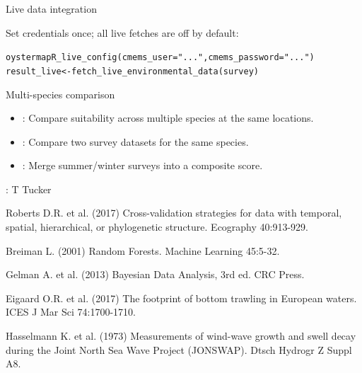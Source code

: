 \documentclass[a4paper]{book}
\begin{document}
%
\begin{Section}{Live data integration}

Set credentials once; all live fetches are off by default:

\begin{alltt}oystermapR_live_config(cmems_user = "...", cmems_password = "...")
result_live <- fetch_live_environmental_data(survey)
\end{alltt}

\end{Section}
%
\begin{Section}{Multi-species comparison}

\begin{itemize}

\item{} : Compare suitability across multiple species at the
same locations.
\item{} : Compare two survey datasets for the same species.
\item{} : Merge summer/winter surveys into a composite score.

\end{itemize}

\end{Section}
%
\begin{Author}
: T Tucker 

\end{Author}
%
\begin{References}
Roberts D.R. et al. (2017) Cross-validation strategies for data with
temporal, spatial, hierarchical, or phylogenetic structure. Ecography
40:913-929. 

Breiman L. (2001) Random Forests. Machine Learning 45:5-32.

Gelman A. et al. (2013) Bayesian Data Analysis, 3rd ed. CRC Press.

Eigaard O.R. et al. (2017) The footprint of bottom trawling in European
waters. ICES J Mar Sci 74:1700-1710.

Hasselmann K. et al. (1973) Measurements of wind-wave growth and swell
decay during the Joint North Sea Wave Project (JONSWAP). Dtsch
Hydrogr Z Suppl A8.
\end{References}
\end{document}
